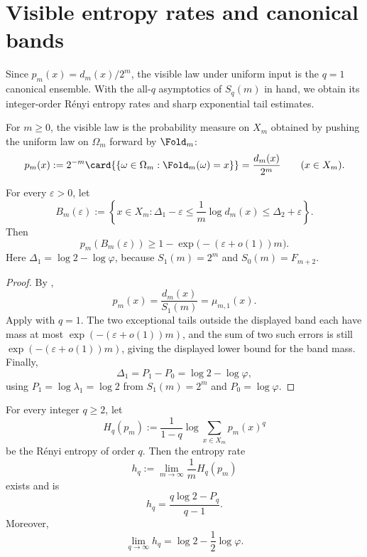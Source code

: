 \section{Visible entropy rates and canonical bands}\label{sec:ledger}

Since \(p_m(x)=d_m(x)/2^m\), the visible law under uniform input is the
\(q=1\) canonical ensemble.  With the all-\(q\) asymptotics of \(S_q(m)\) in
hand, we obtain its integer-order R\'enyi entropy rates
\cite{CoverThomas2006} and sharp exponential tail estimates.

\begin{definition}
\label{def:visible-law}
For \(m\ge0\), the visible law is the probability measure on \(X_m\) obtained
by pushing the uniform law on \(\Omega_m\) forward by \(\Fold_m\):
\[
  p_m(x):=2^{-m}\card{\{\omega\in\Omega_m:\Fold_m(\omega)=x\}}
  =
  \frac{d_m(x)}{2^m}
  \qquad (x\in X_m).
\]
\end{definition}

\begin{corollary}
\label{cor:visible-band}
For every \(\varepsilon>0\), let
\[
  B_m(\varepsilon):=
  \left\{
    x\in X_m:
    \Delta_1-\varepsilon\le \frac1m\log d_m(x)
    \le \Delta_2+\varepsilon
  \right\}.
\]
Then
\[
  p_m(B_m(\varepsilon))
  \ge 1-\exp\!\bigl(-(\varepsilon+o(1))m\bigr).
\]
Here \(\Delta_1=\log2-\log\varphi\), because
\(S_1(m)=2^m\) and \(S_0(m)=F_{m+2}\).
\end{corollary}

\begin{proof}
By ,
\[
  p_m(x)=\frac{d_m(x)}{S_1(m)}=\mu_{m,1}(x).
\]
Apply  with \(q=1\).  The two exceptional tails
outside the displayed band each have mass at most
\(\exp(-(\varepsilon+o(1))m)\), and the sum of two such errors is still
\(\exp(-(\varepsilon+o(1))m)\), giving the displayed lower bound for the
band mass.  Finally,
\[
  \Delta_1=P_1-P_0=\log2-\log\varphi,
\]
using \(P_1=\log\lambda_1=\log2\) from \(S_1(m)=2^m\) and
\(P_0=\log\varphi\).
\end{proof}

\begin{theorem}
\label{thm:renyi-entropy-rate}
For every integer \(q\ge2\), let
\[
  H_q(p_m):=\frac{1}{1-q}\log\sum_{x\in X_m}p_m(x)^q
\]
be the R\'enyi entropy of order \(q\).  Then the entropy rate
\[
  h_q:=\lim_{m\to\infty}\frac1mH_q(p_m)
\]
exists and is
\[
  h_q=\frac{q\log2-P_q}{q-1}.
\]
Moreover,
\[
  \lim_{q\to\infty}h_q=\log2-\frac12\log\varphi .
\]
\end{theorem}

